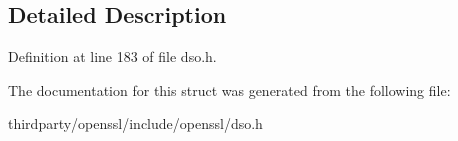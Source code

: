\subsection{Detailed Description}


Definition at line 183 of file dso.\+h.



The documentation for this struct was generated from the following file\+:\begin{DoxyCompactItemize}
\item 
thirdparty/openssl/include/openssl/dso.\+h\end{DoxyCompactItemize}
